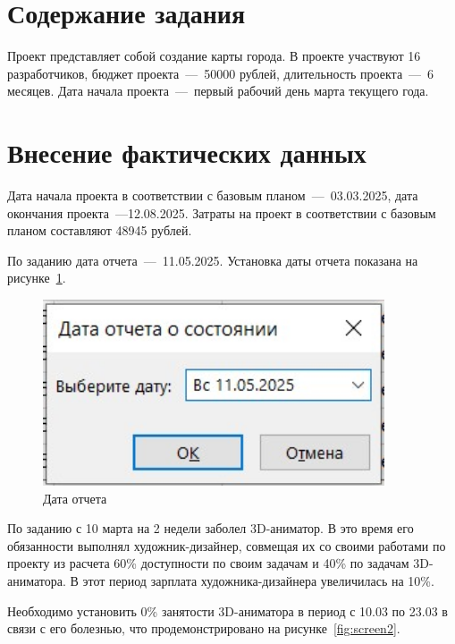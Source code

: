 \setcounter{page}{2}

\section{Содержание задания}
Проект представляет собой создание карты города.
В проекте участвуют 16 разработчиков, бюджет проекта~---~50000 рублей, длительность проекта~---~6 месяцев.
Дата начала проекта~---~первый рабочий день марта текущего года.


\section{Внесение фактических данных}

Дата начала проекта в соответствии с базовым планом~---~03.03.2025, дата окончания проекта~---12.08.2025.
Затраты на проект в соответствии с базовым планом составляют 48945 рублей. 

По заданию дата отчета~---~11.05.2025.
Установка даты отчета показана на рисунке~\ref{fig:screen1}.

\begin{figure}[H]
	\centering
	\includegraphics[width=0.9\textwidth]{img/screen1_report.jpg}
	\caption{Дата отчета}
	\label{fig:screen1}
\end{figure}

По заданию с 10 марта на 2 недели заболел 3D-аниматор.
В это время его обязанности выполнял художник-дизайнер, совмещая их со своими работами по проекту из расчета 60\% доступности по своим задачам и 40\% по задачам 3D-аниматора.
В этот период зарплата художника-дизайнера увеличилась на 10\%.

Необходимо установить 0\% занятости 3D-аниматора в период с 10.03 по 23.03 в связи с его болезнью, что продемонстрировано на рисунке~\ref{fig:screen2}. 

